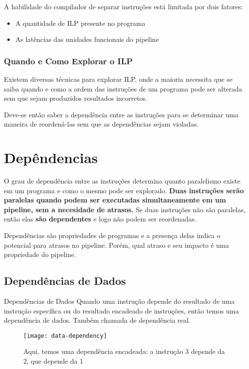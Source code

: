 A habilidade do compilador de separar instruções está limitada por dois fatores:
\begin{itemize}
  \item A quantidade de ILP presente no programa

  \item As latências das unidades funcionais do pipeline
\end{itemize}

\subsubsection{Quando e Como Explorar o ILP}
Existem diversas técnicas para explorar ILP, onde a maioria necessita que se saiba quando e como a ordem das instruções de um programa pode ser alterada sem que sejam produzidos resultados incorretos.

Deve-se então saber a dependência entre as instruções para se determinar uma maneira de reordená-las sem que as dependências sejam violadas.





\section{Depêndencias}
O grau de dependência entre as instruções determina quanto paralelismo existe em um programa e como o mesmo pode ser explorado. \textbf{Duas instruções serão paralelas quando podem ser executadas simultaneamente em um pipeline, sem a necesidade de atrasos.} Se duas instruções não são paralelas, então elas \textbf{são dependentes} e logo não podem ser reordenadas.

Dependências são propriedades de programas e a presença delas indica o potencial para atrasos no pipeline. Porém, qual atraso e seu impacto é uma propriedade do pipeline.




\subsection{Dependências de Dados}
\begin{definicao}{Dependências de Dados}
  Quando uma instrução depende do resultado de uma instrução específica ou do resultado encadeado de instruções, então temos uma dependência de dados. Também chamada de dependência real.
\end{definicao}

\begin{figure}[ht]
  \centering
  \texttt{[image: data-dependency]}
  \caption{Aqui, temos uma dependência encadeada: a instrução 3 depende da 2, que depende da 1}
  \label{fig:data-dependency}
\end{figure}

